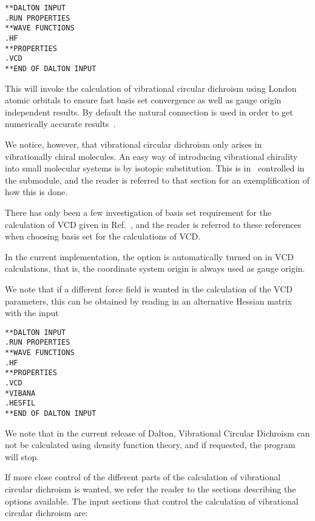 \begin{verbatim}
**DALTON INPUT
.RUN PROPERTIES
**WAVE FUNCTIONS
.HF
**PROPERTIES
.VCD
**END OF DALTON INPUT
\end{verbatim}

This will invoke the calculation of vibrational circular dichroism
using London atomic orbitals to ensure fast
basis set convergence as 
well as gauge origin independent results. By
default the natural 
connection is used in order to get
numerically accurate
results~\cite{joklbkrthpjtca90,krthjopjklbcpl235}.

We notice, however, that vibrational circular dichroism only arises in
vibrationally chiral molecules. An easy way of introducing
vibrational chirality into small molecular systems is by isotopic
substitution. This is in 
\siraba\ controlled in the  submodule, and the reader is
referred to that section for an exemplification of how this is done. 

There has only  been a few investigation of basis set requirement for
the calculation of VCD given in
Ref.~\cite{klbpjthkrhjajjcp100,klbpjthkrfd99}, 
and the reader is referred to these references when choosing basis set
for the calculations of VCD. 

In the current implementation, the  option is automatically
turned on in VCD calculations, that is, the coordinate system origin
is always used as gauge origin.

We note that if a different force field is wanted in the calculation
of the VCD parameters, this can be obtained by reading in an
alternative Hessian matrix with the input

\begin{verbatim}
**DALTON INPUT
.RUN PROPERTIES
**WAVE FUNCTIONS
.HF
**PROPERTIES
.VCD
*VIBANA
.HESFIL
**END OF DALTON INPUT
\end{verbatim}

We note that in the current release of Dalton, Vibrational Circular
Dichroism can not be calculated using density function theory, and if
requested, the program will stop. 

If more close control of the different parts of the calculation of
vibrational circular dichroism is wanted, we refer the reader to the
sections describing the options available. The input sections that control
the calculation of vibrational circular dichroism are:

